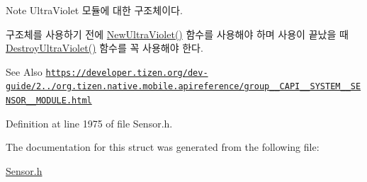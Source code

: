 \begin{DoxyNote}{Note}
Ultra\-Violet 모듈에 대한 구조체이다. \par
 구조체를 사용하기 전에 \hyperlink{Sensor_8h_a7bd9a5544d00f631a0e617b332f0b032}{New\-Ultra\-Violet()} 함수를 사용해야 하며 사용이 끝났을 때 \hyperlink{Sensor_8h_a42bd8c6715137f5fd8892667fe232c5c}{Destroy\-Ultra\-Violet()} 함수를 꼭 사용해야 한다. 
\end{DoxyNote}
\begin{DoxySeeAlso}{See Also}
\href{https://developer.tizen.org/dev-guide/2.3.0/org.tizen.native.mobile.apireference/group__CAPI__SYSTEM__SENSOR__MODULE.html}{\tt https\-://developer.\-tizen.\-org/dev-\/guide/2../org.\-tizen.\-native.\-mobile.\-apireference/group\-\_\-\-\_\-\-C\-A\-P\-I\-\_\-\-\_\-\-S\-Y\-S\-T\-E\-M\-\_\-\-\_\-\-S\-E\-N\-S\-O\-R\-\_\-\-\_\-\-M\-O\-D\-U\-L\-E.\-html} 
\end{DoxySeeAlso}


Definition at line 1975 of file Sensor.\-h.



The documentation for this struct was generated from the following file\-:\begin{DoxyCompactItemize}
\item 
\hyperlink{Sensor_8h}{Sensor.\-h}\end{DoxyCompactItemize}
